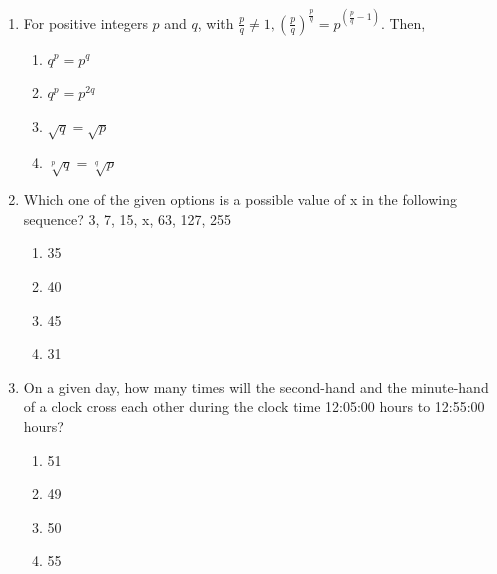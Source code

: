 \documentclass[journal,12pt,onecolumn]{IEEEtran}
\begin{document}
\begin{enumerate}
\item For positive integers $p$ and $q$, with $\frac{p}{q} \neq 1, \left(\frac{p}{q}\right)^{\frac{p}{q}} = p^{\left(\frac{p}{q}-1\right)}$. Then,

\hfill{}

\begin{multicols}{2}
\begin{enumerate}
    \item $q^p = p^q$
    \item $q^p = p^{2q}$
    \item $\sqrt{q} = \sqrt{p}$
    \item $\sqrt[p]{q} = \sqrt[q]{p}$
\end{enumerate}
\end{multicols}

\item Which one of the given options is a possible value of x in the following sequence?
3, 7, 15, x, 63, 127, 255

\hfill{}

\begin{multicols}{4}
\begin{enumerate}
    \item 35
    \item 40
    \item 45
    \item 31
\end{enumerate}
\end{multicols}

\item On a given day, how many times will the second-hand and the minute-hand of a clock cross each other during the clock time 12:05:00 hours to 12:55:00 hours?

\hfill{}

\begin{multicols}{4}
\begin{enumerate}
    \item 51
    \item 49
    \item 50
    \item 55
\end{enumerate}
\end{multicols}





\end{enumerate}
\end{document}
